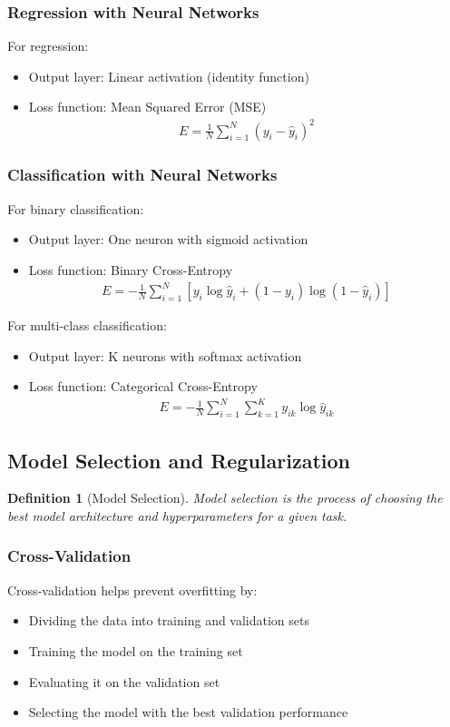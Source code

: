 \documentclass{article}
\newtheorem{definition}{Definition}
\begin{document}
\subsubsection{Regression with Neural Networks}
For regression:
\begin{itemize}
\item Output layer: Linear activation (identity function)
\item Loss function: Mean Squared Error (MSE)
\begin{align}
E = \frac{1}{N}\sum_{i=1}^{N}(y_i - \hat{y}_i)^2
\end{align}
\end{itemize}

\subsubsection{Classification with Neural Networks}
For binary classification:
\begin{itemize}
\item Output layer: One neuron with sigmoid activation
\item Loss function: Binary Cross-Entropy
\begin{align}
E = -\frac{1}{N}\sum_{i=1}^{N}[y_i\log\hat{y}_i + (1-y_i)\log(1-\hat{y}_i)]
\end{align}
\end{itemize}

For multi-class classification:
\begin{itemize}
\item Output layer: K neurons with softmax activation
\item Loss function: Categorical Cross-Entropy
\begin{align}
E = -\frac{1}{N}\sum_{i=1}^{N}\sum_{k=1}^{K}y_{ik}\log\hat{y}_{ik}
\end{align}
\end{itemize}

\subsection{Model Selection and Regularization}
\begin{definition}[Model Selection]
Model selection is the process of choosing the best model architecture and hyperparameters for a given task.
\end{definition}

\subsubsection{Cross-Validation}
Cross-validation helps prevent overfitting by:
\begin{itemize}
\item Dividing the data into training and validation sets
\item Training the model on the training set
\item Evaluating it on the validation set
\item Selecting the model with the best validation performance
\end{itemize}
\end{document}
